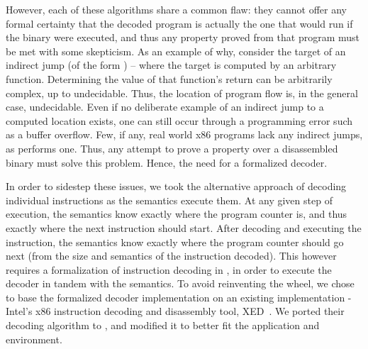 However, each of these algorithms share a common flaw: they cannot offer any formal certainty that the decoded program is actually the one that would run if the binary were executed, and thus any property proved from that program must be met with some skepticism.  As an example of why, consider the target of an indirect jump (of the form ) – where the target is computed by an arbitrary function.  Determining the value of that function’s return can be arbitrarily complex, up to undecidable.  Thus, the location of program flow is, in the general case, undecidable.  Even if no deliberate example of an indirect jump to a computed location exists, one can still occur through a programming error such as a buffer overflow.  Few, if any, real world x86 programs lack any indirect jumps, as  performs one.  Thus, any attempt to prove a property over a disassembled binary must solve this problem.  Hence, the need for a formalized decoder.

In order to sidestep these issues, we took the alternative approach of decoding individual instructions as the semantics execute them.  At any given step of execution, the semantics know exactly where the program counter is, and thus exactly where the next instruction should start.  After decoding and executing the instruction, the semantics know exactly where the program counter should go next (from the size and semantics of the instruction decoded).  This however requires a formalization of instruction decoding in \K, in order to execute the decoder in tandem with the semantics.  To avoid reinventing the wheel, we chose to base the formalized decoder implementation on an existing implementation - Intel’s x86 instruction decoding and disassembly tool, XED~\cite{xed}.  We ported their decoding algorithm to \K, and modified it to better fit the application and environment. 

